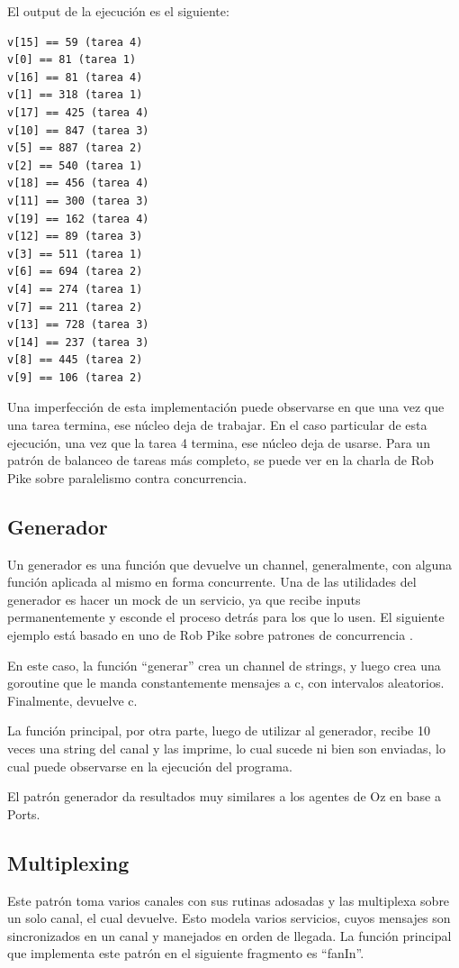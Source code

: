 \documentclass{article}
\begin{document}
El output de la ejecución es el siguiente: 
\begin{verbatim}
v[15] == 59 (tarea 4) 
v[0] == 81 (tarea 1) 
v[16] == 81 (tarea 4) 
v[1] == 318 (tarea 1) 
v[17] == 425 (tarea 4) 
v[10] == 847 (tarea 3) 
v[5] == 887 (tarea 2) 
v[2] == 540 (tarea 1) 
v[18] == 456 (tarea 4) 
v[11] == 300 (tarea 3) 
v[19] == 162 (tarea 4) 
v[12] == 89 (tarea 3) 
v[3] == 511 (tarea 1) 
v[6] == 694 (tarea 2) 
v[4] == 274 (tarea 1) 
v[7] == 211 (tarea 2) 
v[13] == 728 (tarea 3) 
v[14] == 237 (tarea 3) 
v[8] == 445 (tarea 2) 
v[9] == 106 (tarea 2) 
\end{verbatim}

Una imperfección de esta implementación puede observarse en que una vez que una tarea termina, ese núcleo deja de trabajar. En el caso particular de esta ejecución, una vez que la tarea 4 termina, ese núcleo deja de usarse. Para un patrón de balanceo de tareas más completo, se puede ver en la charla de Rob Pike sobre paralelismo contra concurrencia\cite{parvscon}.

\subsection{Generador}
Un generador es una función que devuelve un channel, generalmente, con alguna función aplicada al mismo en forma concurrente. Una de las utilidades del generador es hacer un mock de un servicio, ya que recibe inputs permanentemente y esconde el proceso detrás para los que lo usen. El siguiente ejemplo está basado en uno de Rob Pike sobre patrones de concurrencia \cite{video}.



En este caso, la función ``generar'' crea un channel de strings, y luego crea una goroutine que le manda constantemente mensajes a c, con intervalos aleatorios. Finalmente, devuelve c.

La función principal, por otra parte, luego de utilizar al generador, recibe 10 veces una string del canal y las imprime, lo cual sucede ni bien son enviadas, lo cual puede observarse en la ejecución del programa.

El patrón generador da resultados muy similares a los agentes de Oz en base a Ports.

\subsection{Multiplexing}
Este patrón toma varios canales con sus rutinas adosadas y las multiplexa sobre un solo canal, el cual devuelve. Esto modela varios servicios, cuyos mensajes son sincronizados en un canal y manejados en orden de llegada. La función principal que implementa este patrón en el siguiente fragmento es ``fanIn''.

\end{document}
